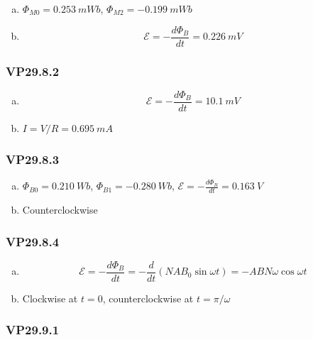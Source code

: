 \documentclass{article}
\begin{document}
\begin{enumerate}[(a)]
  \item $\Phi_{M0} = \qty{0.253}{mWb}$, $\Phi_{M2} = -\qty{0.199}{mWb}$

  \item \[\mathcal{E} = -\frac{d \Phi_B}{dt} = \qty{0.226}{mV}\]
\end{enumerate}

\subsubsection{VP29.8.2}

\begin{enumerate}[(a)]
  \item \[\mathcal{E} = -\frac{d \Phi_B}{dt} = \qty{10.1}{mV}\]

  \item $I = V / R = \qty{0.695}{mA}$
\end{enumerate}

\subsubsection{VP29.8.3}

\begin{enumerate}[(a)]
  \item $\Phi_{B0} = \qty{0.210}{Wb}$, $\Phi_{B1} = \qty{-0.280}{Wb}$, $\mathcal{E} = -\frac{d \Phi_B}{dt} = \qty{0.163}{V}$

  \item Counterclockwise
\end{enumerate}

\subsubsection{VP29.8.4}

\begin{enumerate}[(a)]
  \item \[\mathcal{E} = -\frac{d \Phi_B}{dt} = -\frac{d}{dt} (N A B_0 \sin \omega t) = -A B N \omega \cos \omega t\]

  \item Clockwise at $t = 0$, counterclockwise at $t = \pi / \omega$
\end{enumerate}

\subsubsection{VP29.9.1}
\end{document}
